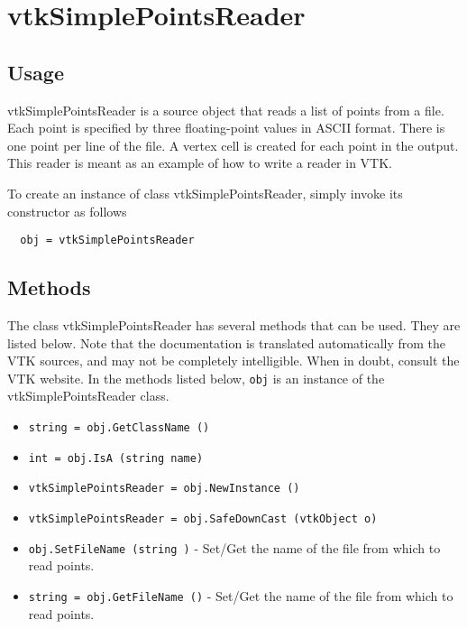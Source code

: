 \section{vtkSimplePointsReader}

\subsection{Usage}

 vtkSimplePointsReader is a source object that reads a list of
 points from a file.  Each point is specified by three
 floating-point values in ASCII format.  There is one point per line
 of the file.  A vertex cell is created for each point in the
 output.  This reader is meant as an example of how to write a
 reader in VTK.

To create an instance of class vtkSimplePointsReader, simply
invoke its constructor as follows
\begin{verbatim}
  obj = vtkSimplePointsReader
\end{verbatim}
\subsection{Methods}

The class vtkSimplePointsReader has several methods that can be used.
  They are listed below.
Note that the documentation is translated automatically from the VTK sources,
and may not be completely intelligible.  When in doubt, consult the VTK website.
In the methods listed below, \verb|obj| is an instance of the vtkSimplePointsReader class.
\begin{itemize}
\item  \verb|string = obj.GetClassName ()|

\item  \verb|int = obj.IsA (string name)|

\item  \verb|vtkSimplePointsReader = obj.NewInstance ()|

\item  \verb|vtkSimplePointsReader = obj.SafeDownCast (vtkObject o)|

\item  \verb|obj.SetFileName (string )| -  Set/Get the name of the file from which to read points.

\item  \verb|string = obj.GetFileName ()| -  Set/Get the name of the file from which to read points.

\end{itemize}
